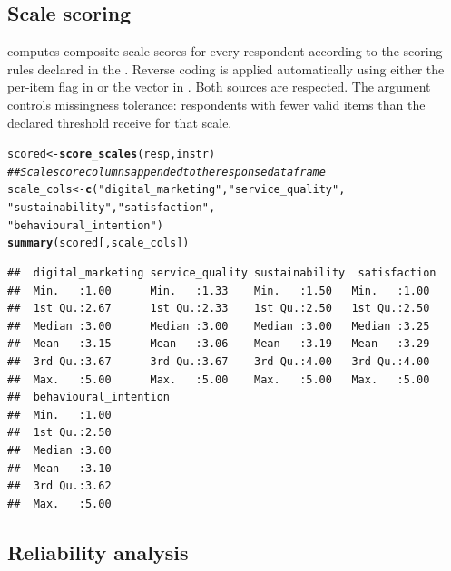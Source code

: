 \documentclass[article]{jss}\usepackage[]{graphicx}\usepackage[]{xcolor}
\makeatletter
\newcommand{\hlsng}[1]{\textcolor[rgb]{0.192,0.494,0.8}{#1}}%
\newcommand{\hlcom}[1]{\textcolor[rgb]{0.678,0.584,0.686}{\textit{#1}}}%
\newcommand{\hldef}[1]{\textcolor[rgb]{0.345,0.345,0.345}{#1}}%
\newcommand{\hlkwb}[1]{\textcolor[rgb]{0.69,0.353,0.396}{#1}}%
\newcommand{\hlkwd}[1]{\textcolor[rgb]{0.737,0.353,0.396}{\textbf{#1}}}%
\newenvironment{kframe}{%
 \def\at@end@of@kframe{}%
 \ifinner\ifhmode%
  \def\at@end@of@kframe{\end{minipage}}%
  \begin{minipage}{\columnwidth}%
 \fi\fi%
 \def\FrameCommand##1{\hskip\@totalleftmargin \hskip-\fboxsep
 \colorbox{shadecolor}{##1}\hskip-\fboxsep
     \hskip-\linewidth \hskip-\@totalleftmargin \hskip\columnwidth}%
 \MakeFramed {\advance\hsize-\width
   \@totalleftmargin\z@ \linewidth\hsize
   \@setminipage}}%
 {\par\unskip\endMakeFramed%
 \at@end@of@kframe}
\newenvironment{knitrout}{}{} %
\makeatother
\begin{document}
\subsection{Scale scoring}

 computes composite scale scores for every
respondent according to the scoring rules declared in the
. Reverse coding is applied automatically using either
the per-item  flag in  or the
 vector in . Both sources are
respected. The  argument controls missingness
tolerance: respondents with fewer valid items than the declared
threshold receive  for that scale.

\begin{knitrout}
\color{fgcolor}\begin{kframe}
\begin{alltt}
\hldef{scored} \hlkwb{<-} \hlkwd{score_scales}\hldef{(resp, instr)}
\hlcom{## Scale score columns appended to the response data frame}
\hldef{scale_cols} \hlkwb{<-} \hlkwd{c}\hldef{(}\hlsng{"digital_marketing"}\hldef{,} \hlsng{"service_quality"}\hldef{,}
                \hlsng{"sustainability"}\hldef{,} \hlsng{"satisfaction"}\hldef{,}
                \hlsng{"behavioural_intention"}\hldef{)}
\hlkwd{summary}\hldef{(scored[, scale_cols])}
\end{alltt}
\begin{verbatim}
##  digital_marketing service_quality sustainability  satisfaction 
##  Min.   :1.00      Min.   :1.33    Min.   :1.50   Min.   :1.00  
##  1st Qu.:2.67      1st Qu.:2.33    1st Qu.:2.50   1st Qu.:2.50  
##  Median :3.00      Median :3.00    Median :3.00   Median :3.25  
##  Mean   :3.15      Mean   :3.06    Mean   :3.19   Mean   :3.29  
##  3rd Qu.:3.67      3rd Qu.:3.67    3rd Qu.:4.00   3rd Qu.:4.00  
##  Max.   :5.00      Max.   :5.00    Max.   :5.00   Max.   :5.00  
##  behavioural_intention
##  Min.   :1.00         
##  1st Qu.:2.50         
##  Median :3.00         
##  Mean   :3.10         
##  3rd Qu.:3.62         
##  Max.   :5.00
\end{verbatim}
\end{kframe}
\end{knitrout}

\subsection{Reliability analysis}
\end{document}
